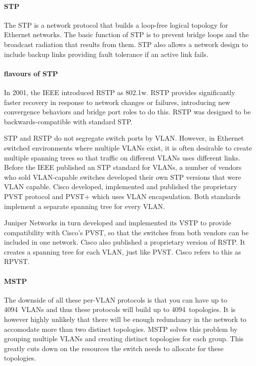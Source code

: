 \paragraph{\acf{STP}}
The \acl{STP} is a network protocol that builds a loop-free logical topology for Ethernet networks.
The basic function of \acs{STP} is to prevent bridge loops and the broadcast radiation that results from them.
\acs{STP} also allows a network design to include backup links providing fault tolerance if an active link fails.

\paragraph{flavours of \acs{STP}}
In 2001, the \acs{IEEE} introduced \acf{RSTP} as 802.1w.
\acs{RSTP} provides significantly faster recovery in response to network changes or failures, introducing new convergence behaviors and bridge port roles to do this.
\acs{RSTP} was designed to be backwards-compatible with standard \acs{STP}.

\acs{STP} and \acs{RSTP} do not segregate switch ports by \acs{VLAN}.
However, in Ethernet switched environments where multiple \acsp{VLAN} exist, it is often desirable to create multiple spanning trees so that traffic on different \acsp{VLAN} uses different links.
Before the \acs{IEEE} published an \acs{STP} standard for \acsp{VLAN}, a number of vendors who sold \acs{VLAN}-capable switches developed their own \acs{STP} versions that were \acs{VLAN} capable.
Cisco developed, implemented and published the proprietary \acf{PVST} protocol and \acs{PVST+} which uses  \acs{VLAN} encapsulation.
Both standards implement a separate spanning tree for every \acs{VLAN}.

Juniper Networks in turn developed and implemented its \acf{VSTP} to provide compatibility with Cisco's \acs{PVST}, so that the switches from both vendors can be included in one network.
Cisco also published a proprietary version of \acf{RSTP}.
It creates a spanning tree for each \acs{VLAN}, just like \acs{PVST}.
Cisco refers to this as \acf{RPVST}.


\paragraph{\acf{MSTP}}
The downside of all these per-\acs{VLAN} protocols is that you can have up to 4094~\acsp{VLAN} and thus these protocols will build up to 4094~topologies.
It is however highly unlikely that there will be enough redundancy in the network to accomodate more than two distinct topologies.
\acs{MSTP} solves this problem by grouping multiple \acsp{VLAN} and creating distinct topologies for each group.
This greatly cuts down on the resources the switch needs to allocate for these topologies.


